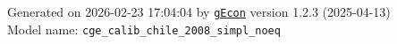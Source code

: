 \documentclass[10pt,a4paper]{article}
\numberwithin{equation}{section}
\begin{document}
\begin{landscape}
\begin{flushleft}{\large
Generated  on 2026-02-23 17:04:04 by \href{http://gecon.r-forge.r-project.org/}{\texttt{gEcon}} version 1.2.3 (2025-04-13)\\
Model name: \verb+cge_calib_chile_2008_simpl_noeq+
}\end{flushleft}


\end{landscape}

\end{document}
